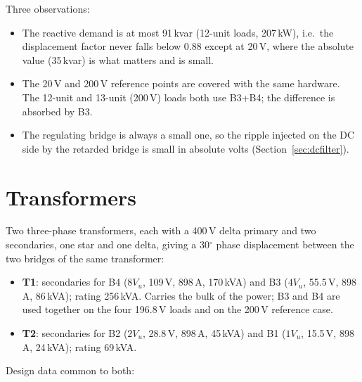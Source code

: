 \documentclass[11pt,a4paper]{article}
\newcommand{\ex}{e_x}
\begin{document}
\begin{table}[h]
\centering
\small

\caption{Operating points. $\ex = 6$\,\%, $\alpha_{min} = 10^\circ$, $V_T = 1.3$\,V. The 20\,V reference case uses the 2-unit bridge at $52^\circ$ because 20\,V exceeds what the 1-unit bridge can deliver; its 35\,kvar are nevertheless negligible in absolute terms.}
\label{tab:cases}
\end{table}

Three observations:
\begin{itemize}
\item The reactive demand is at most 91\,kvar (12-unit loads, 207\,kW), i.e.\ the displacement factor never falls below 0.88 except at 20\,V, where the absolute value (35\,kvar) is what matters and is small.
\item The 20\,V and 200\,V reference points are covered with the same hardware. The 12-unit and 13-unit (200\,V) loads both use B3+B4; the difference is absorbed by B3.
\item The regulating bridge is always a small one, so the ripple injected on the DC side by the retarded bridge is small in absolute volts (Section~\ref{sec:dcfilter}).
\end{itemize}

\section{Transformers}
\label{sec:transformers}

Two three-phase transformers, each with a 400\,V delta primary and two secondaries, one star and one delta, giving a 30$^\circ$ phase displacement between the two bridges of the same transformer:

\begin{itemize}
\item \textbf{T1}: secondaries for B4 ($8V_u$, 109\,V, 898\,A, 170\,kVA) and B3 ($4V_u$, 55.5\,V, 898\,A, 86\,kVA); rating 256\,kVA. Carries the bulk of the power; B3 and B4 are used together on the four 196.8\,V loads and on the 200\,V reference case.
\item \textbf{T2}: secondaries for B2 ($2V_u$, 28.8\,V, 898\,A, 45\,kVA) and B1 ($1V_u$, 15.5\,V, 898\,A, 24\,kVA); rating 69\,kVA.
\end{itemize}

Design data common to both:
\end{document}
